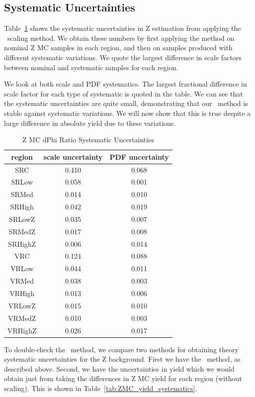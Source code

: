\subsection*{Systematic Uncertainties}

Table~\ref{tab:ZMC_ratio_systematics} shows the systematic uncertainties in Z estimation from applying the \mindphijm\ scaling method. We obtain these numbers by first applying the method on nominal Z MC samples in each region, and then on samples produced with different systematic variations. We quote the largest difference in scale factors between nominal and systematic samples for each region.

We look at both scale and PDF systematics. The largest fractional difference in scale factor for each type of systematic is quoted in the table. We can see that the systematic uncertainties are quite small, demonstrating that our \mindphijm\ method is stable against systematic variations. We will now show that this is true despite a large difference in absolute yield due to these variations.

\begin{table}[htbp]
\caption{Z MC dPhi Ratio Systematic Uncertainties}
\begin{center}
\begin{tabular}{c|c|c}
region & scale uncertainty & PDF uncertainty \\
\hline
SRC & 0.410 & 0.068 \\
SRLow & 0.058 & 0.001 \\
SRMed & 0.014 & 0.010 \\
SRHigh & 0.042 & 0.019 \\
SRLowZ & 0.035 & 0.007 \\
SRMedZ & 0.017 & 0.008 \\
SRHighZ & 0.006 & 0.014 \\
VRC & 0.124 & 0.088 \\
VRLow & 0.044 & 0.011 \\
VRMed & 0.038 & 0.003 \\
VRHigh & 0.013 & 0.006 \\
VRLowZ & 0.015 & 0.010 \\
VRMedZ & 0.010 & 0.003 \\
VRHighZ & 0.026 & 0.017 \\
\end{tabular}
\end{center}
\label{tab:ZMC_ratio_systematics}
\end{table}

To double-check the \mindphijm\ method, we compare two methods for obtaining theory systematic uncertainties for the Z background. First we have the \mindphijm\ method, as described above. Second, we have the uncertainties in yield which we would obtain just from taking the differences in Z MC yield for each region (without scaling). This is shown in Table~\ref{tab:ZMC_yield_systematics}.


